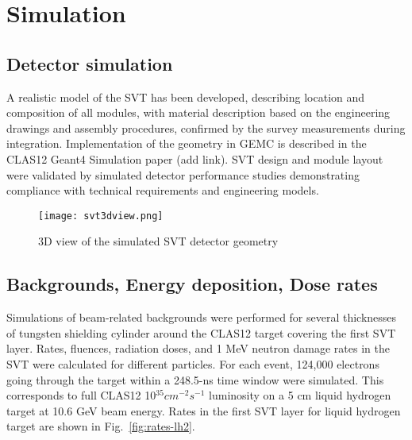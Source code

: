 \section{Simulation}



\subsection{Detector simulation}

A realistic model of the SVT has been developed, describing location and composition of all modules, with material description based on the engineering drawings and assembly procedures, confirmed by the survey measurements during integration. Implementation of the geometry in GEMC is described in the CLAS12 Geant4 Simulation paper (add link). SVT design and module layout were validated by simulated detector performance studies demonstrating compliance with technical requirements and engineering models.   

\begin{figure}[hbt] 
\centering 
\texttt{[image: svt3dview.png]}
\caption{3D view of the simulated SVT detector geometry}
\label{fig:svt3dview}
\end{figure}

\subsection{Backgrounds, Energy deposition, Dose rates}

Simulations of beam-related backgrounds were performed for several thicknesses of tungsten shielding cylinder around the CLAS12 target covering the first SVT layer. Rates, fluences, radiation doses, and 1 MeV neutron damage rates in the SVT were calculated for different particles. For each event, 124,000 electrons going through the target within a 248.5-ns time window were simulated. This corresponds to full CLAS12 10$^{35} cm^{-2}s^{-1}$ luminosity on a 5 cm liquid hydrogen target at 10.6 GeV beam energy. Rates in the first SVT layer for liquid hydrogen target are shown in Fig.~\ref{fig:rates-lh2}.

